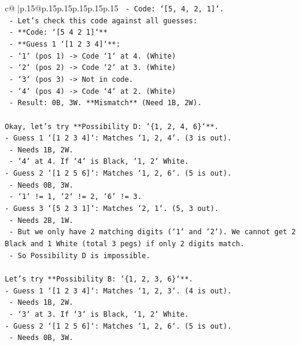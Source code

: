 \documentclass{article}
\begin{document}
{\begin{supertabular}{c@{$\;$}|p{.15\linewidth}@{}p{.15\linewidth}p{.15\linewidth}p{.15\linewidth}p{.15\linewidth}p{.15\linewidth}}
{{{\texttt{  {-} Code: `{[}5, 4, 2, 1{]}`.} \\
\texttt{  {-} Let's check this code against all guesses:} \\
\texttt{    {-} **Code: `{[}5 4 2 1{]}`**} \\
\texttt{    {-} **Guess 1 `{[}1 2 3 4{]}`**:} \\
\texttt{      {-} `1` (pos 1) {-}> Code `1` at 4. (White)} \\
\texttt{      {-} `2` (pos 2) {-}> Code `2` at 3. (White)} \\
\texttt{      {-} `3` (pos 3) {-}> Not in code.} \\
\texttt{      {-} `4` (pos 4) {-}> Code `4` at 2. (White)} \\
\texttt{      {-} Result: 0B, 3W. **Mismatch** (Need 1B, 2W).} \\
\\ 
\texttt{Okay, let's try **Possibility D: `\{1, 2, 4, 6\}`**.} \\
\texttt{{-} Guess 1 `{[}1 2 3 4{]}`: Matches `1, 2, 4`. (3 is out).} \\
\texttt{  {-} Needs 1B, 2W.} \\
\texttt{  {-} `4` at 4. If `4` is Black, `1, 2` White.} \\
\texttt{{-} Guess 2 `{[}1 2 5 6{]}`: Matches `1, 2, 6`. (5 is out).} \\
\texttt{  {-} Needs 0B, 3W.} \\
\texttt{  {-} `1` != 1, `2` != 2, `6` != 3.} \\
\texttt{{-} Guess 3 `{[}5 2 3 1{]}`: Matches `2, 1`. (5, 3 out).} \\
\texttt{  {-} Needs 2B, 1W.} \\
\texttt{  {-} But we only have 2 matching digits (`1` and `2`). We cannot get 2 Black and 1 White (total 3 pegs) if only 2 digits match.} \\
\texttt{  {-} So Possibility D is impossible.} \\
\\ 
\texttt{Let's try **Possibility B: `\{1, 2, 3, 6\}`**.} \\
\texttt{{-} Guess 1 `{[}1 2 3 4{]}`: Matches `1, 2, 3`. (4 is out).} \\
\texttt{  {-} Needs 1B, 2W.} \\
\texttt{  {-} `3` at 3. If `3` is Black, `1, 2` White.} \\
\texttt{{-} Guess 2 `{[}1 2 5 6{]}`: Matches `1, 2, 6`. (5 is out).} \\
\texttt{  {-} Needs 0B, 3W.} \\
}}}
\end{supertabular}}
\end{document}
